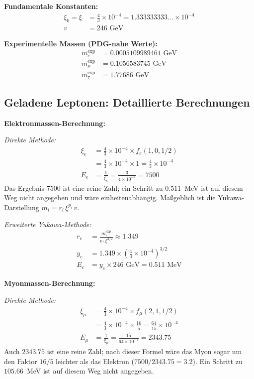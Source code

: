 	\textbf{Fundamentale Konstanten:}
	\begin{align}
		\xi_0 = \xi &= \frac{4}{3} \times 10^{-4} = 1.333333333\ldots \times 10^{-4} \\
		v &= 246 \text{ GeV}
	\end{align}
	
	\textbf{Experimentelle Massen (PDG-nahe Werte):}
	\begin{align}
		m_e^{\text{exp}} &= 0.0005109989461 \text{ GeV} \\
		m_\mu^{\text{exp}} &= 0.1056583745 \text{ GeV} \\
		m_\tau^{\text{exp}} &= 1.77686 \text{ GeV}
	\end{align}
	
	\subsection{Geladene Leptonen: Detaillierte Berechnungen}
	\label{subsec:charged_leptons_detailed}
	
	\textbf{Elektronmassen-Berechnung:}
	
	\textit{Direkte Methode:}
	\begin{align}
		\xi_e &= \frac{4}{3} \times 10^{-4} \times f_e(1,0,1/2) \\
		&= \frac{4}{3} \times 10^{-4} \times 1 = \frac{4}{3} \times 10^{-4} \\
		E_{e} &= \frac{1}{\xi_e} = \frac{3}{4 \times 10^{-4}} = 7500
	\end{align}
	Das Ergebnis $7500$ ist eine reine Zahl; ein Schritt zu $0.511$~MeV ist auf diesem Weg nicht angegeben und wäre einheitenabhängig. Maßgeblich ist die Yukawa-Darstellung $m_i = r_i\,\xi^{p_i}\,v$.
	
	\textit{Erweiterte Yukawa-Methode:}
	\begin{align}
		r_e &= \frac{m_e^{\text{exp}}}{v \cdot \xi^{3/2}} \approx 1.349 \\
		y_e &= 1.349 \times \left(\frac{4}{3} \times 10^{-4}\right)^{3/2} \\
		E_e &= y_e \times 246 \text{ GeV} = 0.511 \text{ MeV}
	\end{align}
	
	\textbf{Myonmassen-Berechnung:}
	
	\textit{Direkte Methode:}
	\begin{align}
		\xi_\mu &= \frac{4}{3} \times 10^{-4} \times f_\mu(2,1,1/2) \\
		&= \frac{4}{3} \times 10^{-4} \times \frac{16}{5} = \frac{64}{15} \times 10^{-4} \\
		E_{\mu} &= \frac{1}{\xi_\mu} = \frac{15}{64 \times 10^{-4}} = 2343.75
	\end{align}
	Auch $2343.75$ ist eine reine Zahl; nach dieser Formel wäre das Myon sogar um den Faktor $16/5$ leichter als das Elektron ($7500/2343.75 = 3.2$). Ein Schritt zu $105.66$~MeV ist auf diesem Weg nicht angegeben.
	
